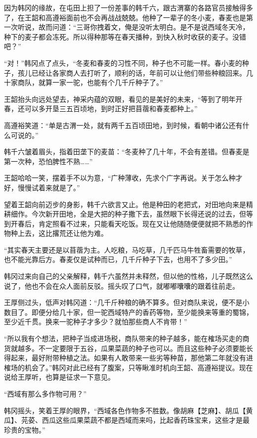 因为韩冈的缘故，在屯田上担了一份差事的韩千六，跟古渭寨的各路官员接触得多了，在王韶和高遵裕面前也不会再战战兢兢。他种了一辈子的冬小麦，春麦也是第一次听说，故而问道：“三哥你拽着文，俺是没听太明白。是不是说西域冬天冷，种下的麦子都会冻死。所以得种那等在春天播种，到快入秋时收获的麦子。没错吧？”

“对！”韩冈点了点头，“冬麦和春麦的习性不同，种子也不可能一样。春小麦的种子，孩儿已经让各家商人去打听了，顺利的话，年前可以让他们带些种粮回来。几十家商队，就算一家一驼，也能有个几千斤种子了。”

王韶抬头向远处望去，神采内蕴的双眼，看见的是美好的未来，“等到了明年开春，还可以多开垦三五百顷地，到时正好把苜蓿和春麦都种上。”

高遵裕笑道：“单是古渭一处，就有两千五百顷田地，到时候，看朝中诸公还有什么可说的。”

韩千六皱着眉头，指着田垄下的麦苗：“冬麦种了几十年，不会有差错。但春麦是第一次种，恐怕脾性不熟……”

王韶哈哈一笑，摆着手不以为意，“广种薄收，先求个广字再说。关于怎么种才好，慢慢试着来就是了。”

望着王韶向前迈步的身影，韩千六欲言又止。他是种田的老把式，对田地向来是精耕细作。今次新开田地，全是大把的种子撒下去，虽然眼下长得还说的过去，但等到开春后，肯定照看不过来，只能看天吃饭。现在又让他随随便便就把不熟悉的作物种上去，这比撂荒还让他为难。

“其实春天主要还是以苜蓿为主。人吃粮，马吃草，几千匹马牛牲畜需要的牧草，也不能光靠后方。春麦仅是试种而已，几千斤种子下去，也用不了多少田。”

韩冈过来向自己的父亲解释，韩千六虽然并未释然，但以他的性格，儿子既然这么说了，他也不会在众人面前反驳。摇头叹了口气，就嘟嘟囔囔的跟着往前走。

王厚侧过头，低声对韩冈道：“几千斤种粮的确不算多。但对商队来说，便不是小数目了。即便分给几十家，但一驼西域特产的香药等物，至少能换来等重的蜀锦，至少近千贯。换来一驼种子才多少？就怕那些商人不肯带！”

“所以我有个想法，把种子当成进场税，商队带来的种子越多，能在榷场买走的商货就越多。不一定要限于五谷，瓜果菜蔬的种子也可以。而且这些种子必须要能长得起来，最好附带种植之法。如果有人敢带来一些劣等种苗，那他第二年就没有进榷场的机会了。”韩冈对此已经有了腹案，只等瞅准时机向王韶、高遵裕提议。现在说给王厚听，也算是征求一下意见。

“西域有那么多作物可用？”

韩冈摇头，笑着王厚的眼界，“西域各色作物多不胜数。像胡麻【芝麻】、胡瓜【黄瓜】、芫荽、西瓜这些瓜果菜蔬不都是西域而来吗，比起香药珠宝来，这些才是最珍贵的宝物。”

